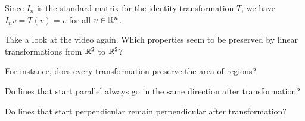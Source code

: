 Since $I_n$ is the standard matrix for the identity transformation $T$, we have 
$I_n v = T(v) = v$ for all $v\in \mathbb R^n$.  

\endedxtext



\endedxvertical











Take a look at the video again.  Which properties seem to be preserved by linear transformations
from $\mathbb R^2$ to $\mathbb R^2$?  


For instance, does every transformation preserve the area of regions? 



Do lines that start parallel always go in the same direction after transformation?  



Do lines that start perpendicular remain perpendicular after transformation? 


